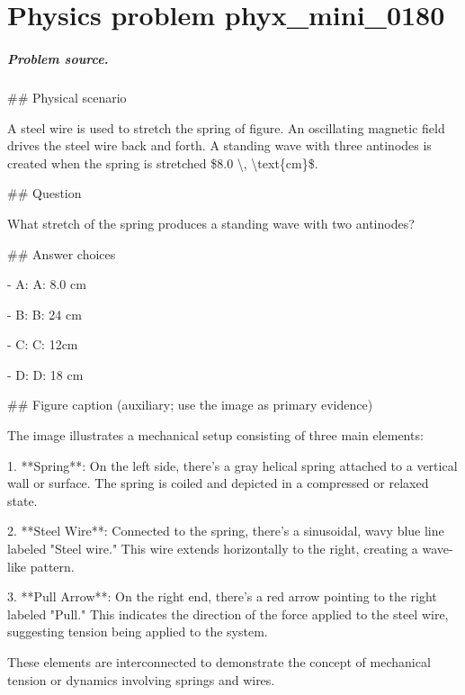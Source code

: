 
\chapter{Physics problem phyx\_mini\_0180}
\label{ch:PhyXMiniProblems_problem_phyx_mini_0180}

\paragraph{Problem source.}
\#\# Physical scenario

A steel wire is used to stretch the spring of figure. An oscillating magnetic field drives the steel wire back and forth. A standing wave with three antinodes is created when the spring is stretched \$8.0 \textbackslash{}, \textbackslash{}text\{cm\}\$.

\#\# Question

What stretch of the spring produces a standing wave with two antinodes?

\#\# Answer choices

- A: A: 8.0 cm

- B: B: 24 cm

- C: C: 12cm

- D: D: 18 cm

\#\# Figure caption (auxiliary; use the image as primary evidence)

The image illustrates a mechanical setup consisting of three main elements:

1. **Spring**: On the left side, there's a gray helical spring attached to a vertical wall or surface. The spring is coiled and depicted in a compressed or relaxed state.

2. **Steel Wire**: Connected to the spring, there's a sinusoidal, wavy blue line labeled "Steel wire." This wire extends horizontally to the right, creating a wave-like pattern.

3. **Pull Arrow**: On the right end, there's a red arrow pointing to the right labeled "Pull." This indicates the direction of the force applied to the steel wire, suggesting tension being applied to the system.

These elements are interconnected to demonstrate the concept of mechanical tension or dynamics involving springs and wires.

